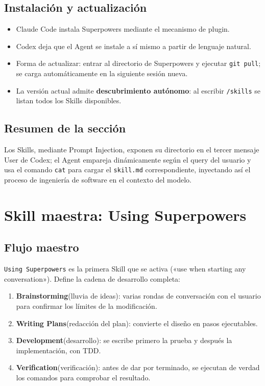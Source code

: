 \documentclass[a4paper]{article}
\begin{document}
\subsection{Instalación y actualización}

\begin{itemize}
    \item Claude Code instala Superpowers mediante el mecanismo de plugin.
    \item Codex deja que el Agent se instale a sí mismo a partir de lenguaje natural.
    \item Forma de actualizar: entrar al directorio de Superpowers y ejecutar \texttt{git pull}; se carga automáticamente en la siguiente sesión nueva.
    \item La versión actual admite \textbf{descubrimiento autónomo}: al escribir \texttt{/skills} se listan todos los Skills disponibles.
\end{itemize}

\subsection{Resumen de la sección}

Los Skills, mediante Prompt Injection, exponen su directorio en el tercer mensaje User de Codex; el Agent empareja dinámicamente según el query del usuario y usa el comando \texttt{cat} para cargar el \texttt{skill.md} correspondiente, inyectando así el proceso de ingeniería de software en el contexto del modelo.
\section{Skill maestra: Using Superpowers}

\subsection{Flujo maestro}

\texttt{Using Superpowers} es la primera Skill que se activa («use when starting any conversation»). Define la cadena de desarrollo completa:

\begin{enumerate}
    \item \textbf{Brainstorming}(lluvia de ideas): varias rondas de conversación con el usuario para confirmar los límites de la modificación.
    \item \textbf{Writing Plans}(redacción del plan): convierte el diseño en pasos ejecutables.
    \item \textbf{Development}(desarrollo): se escribe primero la prueba y después la implementación, con TDD.
    \item \textbf{Verification}(verificación): antes de dar por terminado, se ejecutan de verdad los comandos para comprobar el resultado.
\end{enumerate}
\end{document}
